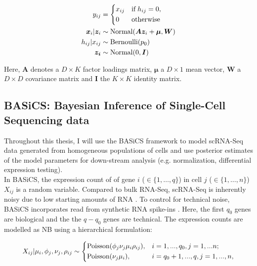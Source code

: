 \begin{align*}
y_{ij} & = 
 \left\lbrace
  \begin{aligned}
    & x_{ij} && \textnormal{if} \; h_{ij} = 0,  \\ 
    & 0 && \textnormal{otherwise}    	    
  \end{aligned}
\right.\\
\bm{x}_{i}|\bm{z}_i&\sim{}\textnormal{Normal}(\bm{Az}_i+\bm{\mu},\bm{W})\\
h_{ij}|x_{ij} & \sim \textnormal{Bernoulli}(p_0)\\
\bm{z_i}&\sim{}\textnormal{Normal}(0,\bm{I})
\end{align*} 

Here, $\bm{A}$ denotes a $D\times{}K$ factor loadings matrix, $\bm{\mu}$ a $D\times{}1$ mean vector, $\bm{W}$ a $D\times{}D$ covariance matrix and $\bm{I}$ the $K\times{}K$ identity matrix.

\subsection{BASiCS: Bayesian Inference of Single-Cell Sequencing data} 
\label{sec0:BASiCS}

Throughout this thesis, I will use the BASiCS framework \citep{Vallejos2015BASiCS, Vallejos2016} to model scRNA-Seq data generated from homogeneous populations of cells and use posterior estimates of the model parameters for down-stream analysis (e.g. normalization, differential expression testing).\\
In BASiCS, the expression count of of gene $i$ ($ \in \{1, \ldots, q\}$) in cell $j$ ($\in \{ 1, \ldots ,n\}$) $X_{ij}$ is a random variable. Compared to bulk RNA-Seq, scRNA-Seq is inherently noisy due to low starting amounts of RNA \citep{Brennecke2013}. To control for technical noise, BASiCS incorporates read from synthetic RNA spike-ins \citep{Jiang2011}. Here, the first $q_0$ genes are biological and the  the $q-q_0$ genes are technical. The expression counts are modelled as NB using a hierarchical formulation:

\begin{equation} 
 X_{ij}|\mu_i,\phi_j,\nu_j,\rho_{ij} \sim
 \left\lbrace
  \begin{aligned}
    &\textnormal{Poisson}(\phi_j\nu_j\mu_i\rho_{ij}), && i=1,...,q_0,j=1,...n;  \\ 
    &\textnormal{Poisson}(\nu_j\mu_i), && i=q_0+1,...,q,j=1,...,n,    	    
  \end{aligned}
\right.
\end{equation} 

